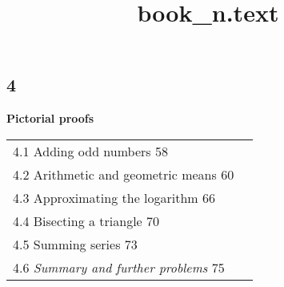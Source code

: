 \documentclass [a4paper]{article}
\title{book_n.text}
\begin{document}
\pagestyle{fancy}
\begin{flushleft}
\section*{\Huge\textbf{4}}
\vspace*{0.5cm}
{\Huge\textbf{Pictorial proofs}}\\
\end{flushleft}
\vspace*{3cm}
\begin{justify}
\colorbox{light-gray}{\begin{minipage}{\textwidth}
\begin{tabular}{l r}
\large 4.1 Adding odd numbers \hspace{10cm} 58 \\
\large 4.2 Arithmetic and geometric means \hspace{7.9cm} 60 \\
\large 4.3 Approximating the logarithm \hspace{8.5cm} 66 \\
\large 4.4 Bisecting a triangle \hspace{ 10.3cm}  70\\
\large 4.5 Summing series \hspace{10.9cm} 73 \\
\large 4.6 \textit{Summary and further problems} \hspace{8.7cm} 75\\
\end{tabular}
\end{minipage}}
\end{justify}
\end{document}
